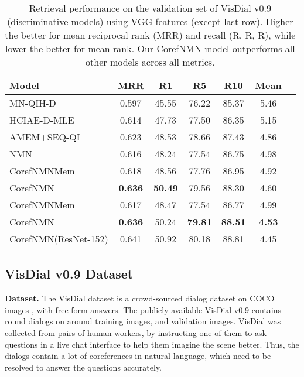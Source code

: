\documentclass[runningheads]{llncs}
\makeatletter
\def\adl@drawiv#1#2#3{\hskip.5\tabcolsep
        \xleaders#3{#2.5\@tempdimb #1{1}#2.5\@tempdimb}#2\z@ plus1fil minus1fil\relax
        \hskip.5\tabcolsep}
\newcommand{\cdashlinelr}[1]{\noalign{\vskip\aboverulesep
           \global\let\@dashdrawstore\adl@draw
           \global\let\adl@draw\adl@drawiv}
  \cdashline{#1}
  \noalign{\global\let\adl@draw\@dashdrawstore
           \vskip\belowrulesep}}
\newcommand{\nmn}{CorefNMN\xspace}
\makeatother
\begin{document}
\begin{table}[t]
	\centering
	\setlength{\tabcolsep}{6pt}
    \begin{tabular}{lcccccc}
	\toprule
	\textbf{Model} & \textbf{MRR} & \textbf{R1} & \textbf{R5}
    				& \textbf{R10} & \textbf{Mean} \\\midrule
MN-QIH-D \cite{visdial} 
    	& 0.597 & 45.55 & 76.22 & 85.37 & 5.46\\
    HCIAE-D-MLE \cite{lu_nips16} 
    	& 0.614 & 47.73 & 77.50 & 86.35 & 5.15\\
    AMEM+SEQ-QI \cite{paul2017visual} 
    	& 0.623 & 48.53 & 78.66 & 87.43 & 4.86\\
    NMN\cite{hu2017learning}
    	& 0.616 & 48.24 & 77.54 & 86.75 & 4.98\\
    \cdashlinelr{1-6}
	\nmn{}Mem
    	& 0.618 & 48.56 & 77.76 & 86.95 & 4.92 \\
	\nmn{}
    	& \textbf{0.636} & \textbf{50.49} & 79.56 & 88.30 & 4.60\\
    \nmn{}Mem
    	& 0.617 & 48.47 & 77.54 & 86.77 & 4.99 \\
    \nmn
    	& \textbf{0.636} & 50.24 & \textbf{79.81} & \textbf{88.51} & \textbf{4.53}\\
\midrule
    \nmn (ResNet-152)
   	 	& 0.641 & 50.92 & 80.18 & 88.81 & 4.45\\
	\bottomrule
	\end{tabular}
\caption{
    Retrieval performance on the validation set of VisDial v0.9 \cite{visdial} 
    (discriminative models) using VGG 	
    \cite{simonyan_iclr15} features (except last row).
    Higher the better for mean reciprocal rank (MRR) and recall 
    (R, R, R), while lower the better for mean rank.
    Our \nmn model outperforms all other models across all metrics.}
    \label{tab:visdial_disc_result_table}
\end{table} 
\subsection{VisDial v0.9 Dataset}


\noindent
\textbf{Dataset.}
The VisDial dataset \cite{visdial} is a crowd-sourced dialog dataset on COCO
images \cite{mscoco}, with free-form answers.
The publicly available VisDial v0.9 contains -round dialogs on around  training images, and  
validation images.
VisDial was collected from pairs of human workers, by instructing one of them 
to ask questions in a live chat interface to help them imagine the scene 
better.
Thus, the dialogs contain a lot of coreferences in natural language, which need 
to be resolved to answer the questions accurately.
\end{document}
